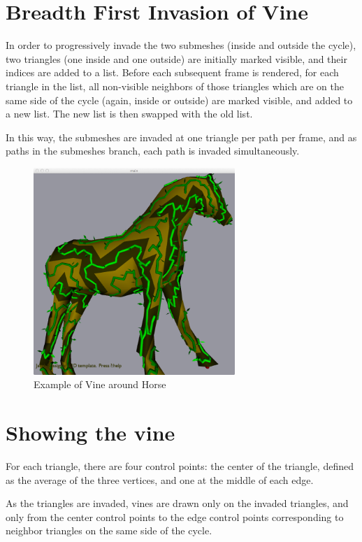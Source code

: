 \documentclass[letterpaper,10pt]{IEEEtran}
\begin{document}
\section{Breadth First Invasion of Vine}

In order to progressively invade the two submeshes (inside and outside the cycle), two triangles (one inside and one outside) are initially marked visible, and their indices are added to a list.
Before each subsequent frame is rendered, for each triangle in the list, all non-visible neighbors of those triangles which are on the same side of the cycle (again, inside or outside) are marked visible, and added to a new list.
The new list is then swapped with the old list.

In this way, the submeshes are invaded at one triangle per path per frame, and as paths in the submeshes branch, each path is invaded simultaneously.

\begin{figure}[!h]
\centering
\includegraphics[width=3in]{data/vine}
\caption{Example of Vine around Horse}
\label{fig_angle}
\end{figure}

\section{Showing the vine}

For each triangle, there are four control points: the center of the triangle, defined as the average of the three vertices, and one at the middle of each edge.

As the triangles are invaded, vines are drawn only on the invaded triangles, and only from the center control points to the edge control points corresponding to neighbor triangles on the same side of the cycle.
\end{document}
